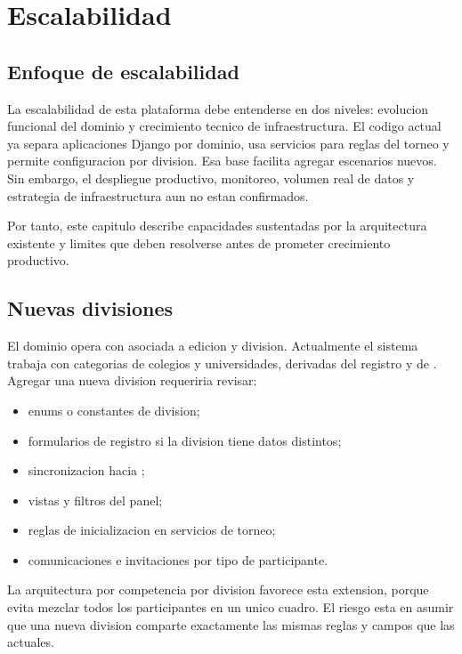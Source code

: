 \chapter{Escalabilidad}
\label{chap:escalabilidad}

\section{Enfoque de escalabilidad}
\label{sec:escalabilidad-enfoque}

La escalabilidad de esta plataforma debe entenderse en dos niveles: evolucion funcional del dominio y crecimiento tecnico de infraestructura. El codigo actual ya separa aplicaciones Django por dominio, usa servicios para reglas del torneo y permite configuracion por division. Esa base facilita agregar escenarios nuevos. Sin embargo, el despliegue productivo, monitoreo, volumen real de datos y estrategia de infraestructura aun no estan confirmados.

Por tanto, este capitulo describe capacidades sustentadas por la arquitectura existente y limites que deben resolverse antes de prometer crecimiento productivo.

\section{Nuevas divisiones}
\label{sec:escalabilidad-divisiones}

El dominio opera con  asociada a edicion y division. Actualmente el sistema trabaja con categorias de colegios y universidades, derivadas del registro y de . Agregar una nueva division requeriria revisar:

\begin{itemize}
  \item enums o constantes de division;
  \item formularios de registro si la division tiene datos distintos;
  \item sincronizacion hacia ;
  \item vistas y filtros del panel;
  \item reglas de inicializacion en servicios de torneo;
  \item comunicaciones e invitaciones por tipo de participante.
\end{itemize}

La arquitectura por competencia por division favorece esta extension, porque evita mezclar todos los participantes en un unico cuadro. El riesgo esta en asumir que una nueva division comparte exactamente las mismas reglas y campos que las actuales.

